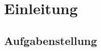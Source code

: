 \chapter{Einleitung}
\label{sec:einleitung}


\section{Aufgabenstellung}
\label{sec:aufgabenstellung}


